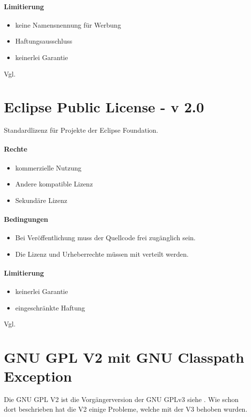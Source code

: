 \paragraph{Limitierung}
\begin{itemize}
    \item keine Namensnennung für Werbung
    \item Haftungsausschluss
    \item keinerlei Garantie
\end{itemize}

Vgl. \cite{bsd-3-clause}

\section{Eclipse Public License - v 2.0}\label{sec:eclipse-public-license---v-2.0}
Standardlizenz für Projekte der Eclipse Foundation.

\paragraph{Rechte}
\begin{itemize}
    \item kommerzielle Nutzung
    \item Andere kompatible Lizenz
    \item Sekundäre Lizenz
\end{itemize}
\paragraph{Bedingungen}
\begin{itemize}
    \item Bei Veröffentlichung muss der Quellcode frei zugänglich sein.
    \item Die Lizenz und Urheberrechte müssen mit verteilt werden.
\end{itemize}

\paragraph{Limitierung}
\begin{itemize}
    \item keinerlei Garantie
    \item eingeschränkte Haftung
\end{itemize}

Vgl. \cite{epl-2}

\section{GNU GPL V2 mit GNU Classpath Exception}\label{sec:gnu-gpl-v2-mit-gnu-classpath-exception}
Die GNU GPL V2 ist die Vorgängerversion der GNU GPLv3 siehe .
Wie schon dort beschrieben hat die V2 einige Probleme, welche mit der V3 behoben wurden.


